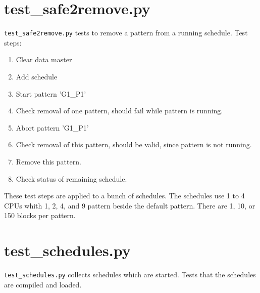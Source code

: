 \documentclass[12pt,a4paper]{report}
\begin{document}
\section{test\_safe2remove.py}
\texttt{test\_safe2remove.py} tests to remove a pattern from a running schedule. Test steps:
\begin{enumerate}
\item Clear data master
\item Add schedule
\item Start pattern 'G1\_P1'
\item Check removal of one pattern, should fail while pattern is running.
\item Abort pattern 'G1\_P1'
\item Check removal of this pattern, should be valid, since pattern is not running.
\item Remove this pattern.
\item Check status of remaining schedule.
\end{enumerate}
These test steps are applied to a bunch of schedules.
The schedules use 1 to 4 CPUs whith 1, 2, 4, and 9 pattern beside the default pattern. There are 1, 10, or 150 blocks per pattern.
\section{test\_schedules.py}
\texttt{test\_schedules.py} collects schedules which are started. Tests that the schedules are compiled and loaded.


\end{document}
